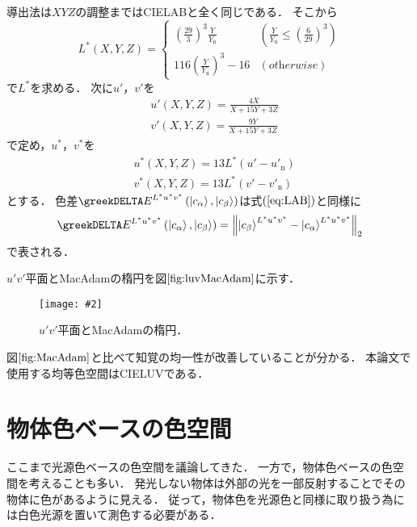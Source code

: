 \documentclass[uplatex,paper=a4,fontsize=4.0truemm,jafontsize=4.0truemm,head_space=30.0truemm,foot_space=30.0truemm,baselineskip=8.0truemm,line_length=40zw,gutter=25.0truemm,oneside,openany,fleqn,hanging_panctuation,open_bracket_pos=nibu_tentsuki,dvipdfmx,jis2004,book,titlepage]{jlreq}
\theoremstyle{mystyle}
\newcommand{\captiondot}[1]{\caption{#1．}}
\newcommand{\figureinput}[4]{\begin{figure}[btp]\centering\texttt{[image: \#2]}\captiondot{#3}\label{fig:#4}\end{figure}}
\newcommand{\mathdisplaystyle}[1]{\(\displaystyle{#1}\)}
\newcommand{\Reference}[1]{\mathdisplaystyle{\ref{#1}}}
\newcommand{\Equationreference}[1]{\mathdisplaystyle{\parentheses{\ref{#1}}}}
\newcommand{\fraction}[2]{\displaystyle{\frac{\displaystyle{#1}}{\displaystyle{#2}}}}
\newcommand{\parentheses}[1]{\left(#1\right)}
\newcommand{\norm}[2]{{\left\lVert#1\right\rVert}_{#2}}
\newcommand{\Diracket}[1]{\left\lvert#1\right\rangle}
\begin{document}
			導出法は\mathdisplaystyle{XYZ}の調整まではCIELABと全く同じである．
			そこから
			\begin{equation*}
				L^\ast\parentheses{X,Y,Z}=\begin{cases}
					\parentheses{\fraction{29}{3}}^3\fraction{Y}{Y_\textrm{n}} & \parentheses{\fraction{Y}{Y_\textrm{n}}\leq\parentheses{\fraction{6}{29}}^3} \\
					116\parentheses{\fraction{Y}{Y_\textrm{n}}}^3-16 & \parentheses{\textit{otherwise}}
				\end{cases}
			\end{equation*}
			で\mathdisplaystyle{L^\ast}を求める．
			次に\mathdisplaystyle{u'}，\mathdisplaystyle{v'}を
			\begin{align*}
				&u'\parentheses{X,Y,Z}=\fraction{4X}{X+15Y+3Z}\\
				&v'\parentheses{X,Y,Z}=\fraction{9Y}{X+15Y+3Z}
			\end{align*}
			で定め，\mathdisplaystyle{u^\ast}，\mathdisplaystyle{v^\ast}を
			\begin{align*}
				&u^\ast\parentheses{X,Y,Z}=13L^\ast\parentheses{u'-u'_\textrm{n}}\\
				&v^\ast\parentheses{X,Y,Z}=13L^\ast\parentheses{v'-v'_\textrm{n}}
			\end{align*}
			とする．
			色差\mathdisplaystyle{\greekDELTA E^{L^\ast u^\ast v^\ast}\parentheses{\Diracket{c_\alpha},\Diracket{c_\beta}}}は式\Equationreference{eq:LAB}と同様に
			\begin{equation}
				\greekDELTA E^{L^\ast u^\ast v^\ast}\parentheses{\Diracket{c_\alpha},\Diracket{c_\beta}}=\norm{\Diracket{c_\beta}^{L^\ast u^\ast v^\ast}-\Diracket{c_\alpha}^{L^\ast u^\ast v^\ast}}{2}\label{eq:LUV}
			\end{equation}
			で表される．

			\mathdisplaystyle{u'v'}平面とMacAdamの楕円を図\Reference{fig:luvMacAdam}に示す．
			\figureinput{width=\linewidth}{D:/a/figs/LuvMacAdam.png}{\mathdisplaystyle{u'v'}平面とMacAdamの楕円}{luvMacAdam}
			図\Reference{fig:MacAdam}と比べて知覚の均一性が改善していることが分かる．
			本論文で使用する均等色空間はCIELUVである．
		\section{物体色ベースの色空間}
			ここまで光源色ベースの色空間を議論してきた．
			一方で，物体色ベースの色空間を考えることも多い．
			発光しない物体は外部の光を一部反射することでその物体に色があるように見える．
			従って，物体色を光源色と同様に取り扱う為には白色光源を置いて測色する必要がある．
\end{document}

